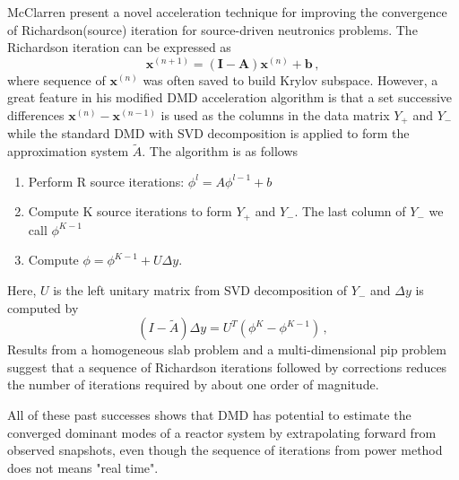 McClarren present a novel acceleration technique for improving the convergence of Richardson(source) iteration for source-driven neutronics problems.\cite{mcclarren_acceleration_2018}
The Richardson iteration can be expressed as 
\begin{equation}
 \mathbf{x}^{(n+1)} = (\mathbf{I}-\mathbf{A})\mathbf{x}^{(n)} + \mathbf{b} \, ,
 \label{eq:richardson}
\end{equation}
where sequence of $\mathbf{x}^{(n)}$ was often saved to build Krylov subspace. 
However, a great feature in his modified DMD acceleration algorithm is that a set successive differences $\mathbf{x}^{(n)}-\mathbf{x}^{(n-1)}$ is used as the columns in the data matrix $Y_+$ and $Y_-$ while the standard DMD with SVD decomposition is applied to form the approximation system $\tilde{A}$.
The algorithm is as follows
\begin{enumerate}
 \item Perform R source iterations: $\phi^{l} = A \phi^{l-1} +b$
 \item Compute K source iterations to form $Y_+$ and $Y_-$. The last column of $Y_-$ we call $\phi^{K-1}$ 
 \item Compute $\phi = \phi^{K-1} + U \Delta y$.
\end{enumerate} 
Here, $U$ is the left unitary matrix from SVD decomposition of $Y_-$ and $\Delta y$ is computed by 
\begin{equation}
 (I - \tilde{A}) \Delta y = U^T(\phi^{K} - \phi^{K-1})\, ,
 \label{eq:McClarren}
\end{equation}
Results from a homogeneous slab problem and a multi-dimensional pip problem suggest that a sequence of Richardson iterations followed by corrections reduces the number of iterations required by about one order of magnitude.

All of these past successes shows that DMD has potential to estimate the converged dominant modes of a reactor system by extrapolating forward from observed snapshots, even though the sequence of iterations from power method does not means "real time".
